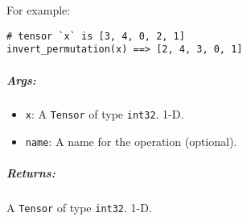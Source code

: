 For example:

\begin{verbatim}
# tensor `x` is [3, 4, 0, 2, 1]
invert_permutation(x) ==> [2, 4, 3, 0, 1]
\end{verbatim}

\subparagraph{Args: }\label{args-60}

\begin{itemize}
\tightlist
\item
  \texttt{x}: A \texttt{Tensor} of type \texttt{int32}. 1-D.
\item
  \texttt{name}: A name for the operation (optional).
\end{itemize}

\subparagraph{Returns: }\label{returns-60}

A \texttt{Tensor} of type \texttt{int32}. 1-D.


